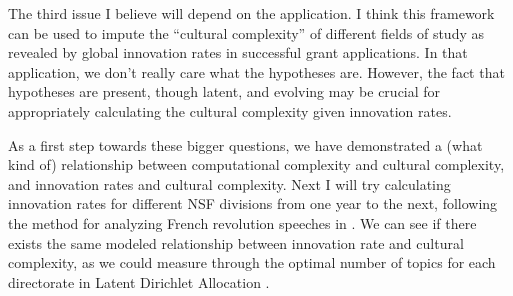 \documentclass[11pt]{amsart}
\begin{document}
The third issue I believe will depend on the application. I think this framework
can be used to impute the ``cultural complexity'' of different fields of study
as revealed by global innovation rates in successful grant applications. 
In that application, we don't really care what the hypotheses are. However, 
the fact that hypotheses are present, though latent, and evolving may be
crucial for appropriately calculating the cultural complexity given innovation
rates. 

As a first step towards these bigger questions, we have demonstrated a
(what kind of) relationship between computational complexity and cultural 
complexity, and innovation rates and cultural complexity. Next I will try 
calculating innovation rates for different NSF divisions from one year to the
next, following the method for analyzing French revolution speeches in 
\cite{Barron2018}. We can see if there exists the same modeled relationship
between innovation rate and cultural complexity, as we could measure through
the optimal number of topics for each directorate in Latent Dirichlet Allocation
\citep{Blei2003,Griffiths2004}.





\end{document}

